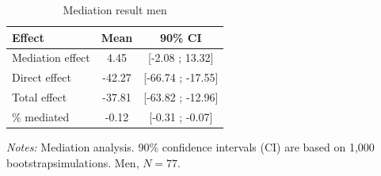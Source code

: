 \begin{table}[htbp]
\centering
\caption{Mediation result men}
\label{tab:mediation_probability_men}
\begin{threeparttable}
\begin{tabular}{@{}lcc@{}}
\toprule
Effect & Mean & 90\% CI \\
\midrule
Mediation effect & 4.45 & [-2.08 ; 13.32] \\
Direct effect & -42.27 & [-66.74 ; -17.55] \\
Total effect & -37.81 & [-63.82 ; -12.96] \\
\% mediated & -0.12 & [-0.31 ; -0.07] \\
\bottomrule
\end{tabular}
\begin{tablenotes}[flushleft]
\footnotesize
\item[] \textit{Notes:} Mediation analysis. 90\% confidence intervals (CI) are based on 1,000 bootstrapsimulations. Men, \(N=77\).
\end{tablenotes}
\end{threeparttable}
\end{table}
